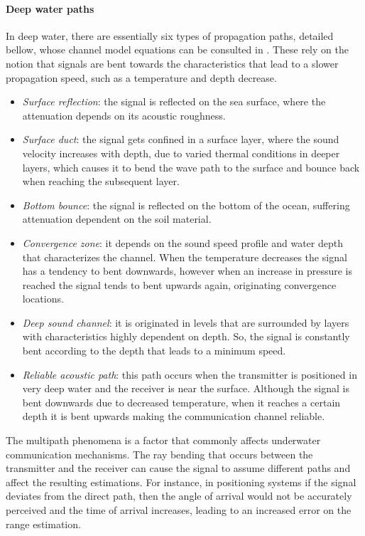 \paragraph{Deep water paths} In deep water, there are essentially six types of propagation paths, detailed bellow, whose channel model equations can be consulted in \cite{multipath-rayleigh-models}. These rely on the notion that signals are bent towards the characteristics that lead to a slower propagation speed, such as a temperature and depth decrease.

\begin{itemize}
	\item \textit{Surface reflection}: the signal is reflected on the sea surface, where the attenuation depends on its acoustic roughness.
	
	\item \textit{Surface duct}: the signal gets confined in a surface layer, where the sound velocity increases with depth, due to varied thermal conditions in deeper layers, which causes it to bend the wave path to the surface and bounce back when reaching the subsequent layer.
	
	\item \textit{Bottom bounce}: the signal is reflected on the bottom of the ocean, suffering attenuation dependent on the soil material.
	
	\item \textit{Convergence zone}: it depends on the sound speed profile and water depth that characterizes the channel. When the temperature decreases the signal has a tendency to bent downwards, however when an increase in pressure is reached the signal tends to bent upwards again, originating convergence locations.
	
	\item \textit{Deep sound channel}: it is originated in levels that are surrounded by layers with characteristics highly dependent on depth. So, the signal is constantly bent according to the depth that leads to a minimum speed. 
	
	\item \textit{Reliable acoustic path}: this path occurs when the transmitter is positioned in very deep water and the receiver is near the surface. Although the signal is bent downwards due to decreased temperature, when it reaches a certain depth it is bent upwards making the communication channel reliable.
\end{itemize}

The multipath phenomena is a factor that commonly affects underwater communication mechanisms. The ray bending that occurs between the transmitter and the receiver can cause the signal to assume different paths and affect the resulting estimations. For instance, in positioning systems if the signal deviates from the direct path, then the angle of arrival would not be accurately perceived and the time of arrival increases, leading to an increased error on the range estimation.

